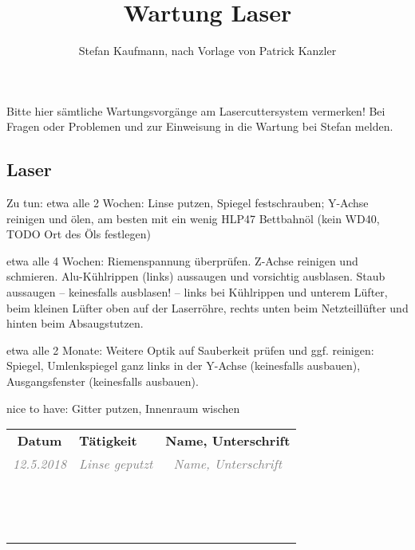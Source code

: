 \documentclass{\basedir/vsh-document}
\title{Wartung Laser}
\author{Stefan Kaufmann, nach Vorlage von Patrick Kanzler}
\newcommand{\thickhline}{\noalign{\hrule height 2pt}}
\begin{document}
Bitte hier sämtliche Wartungsvorgänge am Lasercuttersystem vermerken!
Bei Fragen oder Problemen und zur Einweisung in die Wartung bei Stefan melden.
\vspace{-1.5em}
\subsection*{Laser}
\vspace{-1em}
Zu tun: etwa alle 2 Wochen: Linse putzen, Spiegel festschrauben;  Y-Achse reinigen und ölen, am besten mit ein wenig HLP47 Bettbahnöl (kein WD40, TODO Ort des Öls festlegen)

etwa alle 4 Wochen: Riemenspannung überprüfen. Z-Achse reinigen und schmieren. Alu-Kühlrippen (links) aussaugen und vorsichtig ausblasen. Staub aussaugen -- keinesfalls ausblasen! -- links bei Kühlrippen und unterem Lüfter, beim kleinen Lüfter oben auf der Laserröhre, rechts unten beim Netzteillüfter und hinten beim Absaugstutzen.

etwa alle 2 Monate: Weitere Optik auf Sauberkeit prüfen und ggf. reinigen: Spiegel, Umlenkspiegel ganz links in der Y-Achse (keinesfalls ausbauen), Ausgangsfenster (keinesfalls ausbauen).

nice to have: Gitter putzen, Innenraum wischen


\newcommand{\bsp}[1]{\textcolor{gray}{\itshape #1}}
\newcommand{\beispielzeile}[5]{\bsp{#2} & \bsp{#3} & \bsp{#4} \\ \hline}
\newcommand{\leerzeile}{\vbox{\vspace{2.4em}} & & \\ \hline}
\vspace{-.4em}
\begin{tabularx}{\textwidth}{|c|X|c|} \hline
\bfseries Datum      &  \bfseries Tätigkeit  & \bfseries Name, Unterschrift \\\thickhline
\beispielzeile{BSP}{12.5.2018}{ Linse geputzt }{Name, Unterschrift}
\leerzeile
\leerzeile
\leerzeile
\leerzeile
\leerzeile
\leerzeile
\leerzeile
\leerzeile
\leerzeile
\leerzeile
\leerzeile
\leerzeile
\leerzeile
\leerzeile
\leerzeile
\end{tabularx}
\end{document}
